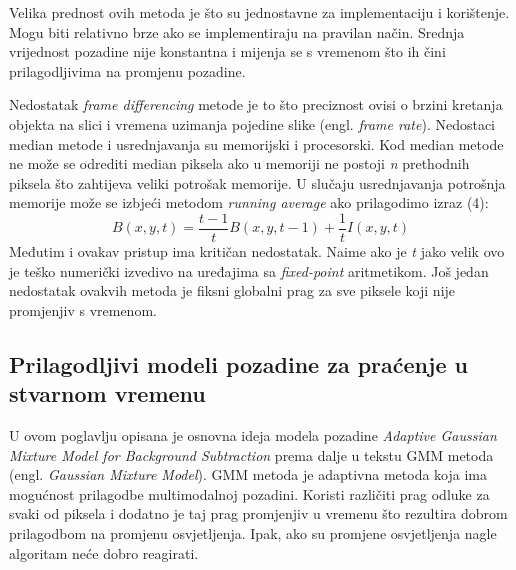 \documentclass[a4paper,twocolumn]{article}
\begin{document}
Velika prednost ovih metoda je što su jednostavne za implementaciju i
korištenje. Mogu biti relativno brze ako se implementiraju na pravilan način.
Srednja vrijednost pozadine nije konstantna i mijenja se s vremenom što ih
čini prilagodljivima na promjenu pozadine.

Nedostatak \textit{frame differencing} metode je to što preciznost ovisi o
brzini kretanja objekta na slici i vremena uzimanja pojedine slike
(engl. \textit{frame rate}). Nedostaci median metode i usrednjavanja su
memorijski i procesorski. Kod median metode ne može se odrediti median piksela
ako u memoriji ne postoji \textit{n} prethodnih piksela što zahtijeva veliki
potrošak memorije. U slučaju usrednjavanja potrošnja memorije može se izbjeći
metodom \textit{running average} ako prilagodimo izraz (4):
\begin{equation}
B(x, y, t) = \frac{t - 1}{t}B(x, y, t - 1) + \frac{1}{t}I(x, y, t)
\end{equation}
Međutim i ovakav pristup ima kritičan nedostatak. Naime ako je \textit{t} jako
velik ovo je teško numerički izvedivo na uređajima sa \textit{fixed-point}
aritmetikom. Još jedan nedostatak ovakvih metoda je fiksni globalni prag
za sve piksele koji nije promjenjiv s vremenom.

\subsection{Prilagodljivi modeli pozadine za praćenje u stvarnom vremenu}
U ovom poglavlju opisana je osnovna ideja modela pozadine
\textit{Adaptive Gaussian Mixture Model for Background Subtraction} prema
\cite{gaussian} dalje u tekstu GMM metoda (engl. \textit{Gaussian Mixture Model}).
GMM metoda je adaptivna metoda koja ima mogućnost prilagodbe multimodalnoj
pozadini. Koristi različiti prag odluke za svaki od piksela i dodatno je
taj prag promjenjiv u vremenu što rezultira dobrom prilagodbom na promjenu
osvjetljenja. Ipak, ako su promjene osvjetljenja nagle algoritam neće dobro
reagirati.
\end{document}
